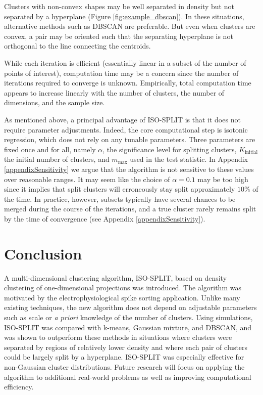 \documentclass[10pt]{article}
\begin{document}
Clusters with non-convex shapes may be well separated in density but not separated by a hyperplane (Figure \ref{fig:example_dbscan}). In these situations, alternative methods such as DBSCAN are preferable. But even when clusters are convex, a pair may be oriented such that the separating hyperplane is not orthogonal to the line connecting the centroids.

While each iteration is efficient (essentially linear in a subset of the number of points of interest), computation time may be a concern since the number of iterations required to converge is unknown. Empirically, total computation time appears to increase linearly with the number of clusters, the number of dimensions, and the sample size.

As mentioned above, a principal advantage of ISO-SPLIT is that it does not require parameter adjustments. Indeed, the core computational step is isotonic regression, which does not rely on any tunable parameters. Three parameters are fixed once and for all, namely $\alpha$, the significance level for splitting clusters, $K_\text{initial}$ the initial number of clusters, and $m_\text{max}$ used in the test statistic. In Appendix \ref{appendixSensitivity} we argue that the algorithm is not sensitive to these values over reasonable ranges. It may seem like the choice of $\alpha=0.1$ may be too high since it implies that split clusters will erroneously stay split approximately $10\%$ of the time. In practice, however, subsets typically have several chances to be merged during the course of the iterations, and a true cluster rarely remains split by the time of convergence (see Appendix \ref{appendixSensitivity}).


\section{Conclusion}
\label{s:conc}

A multi-dimensional clustering algorithm, ISO-SPLIT, based on density clustering of one-dimensional projections was introduced. The algorithm was motivated by the electrophysiological spike sorting application. Unlike many existing techniques, the new algorithm does not depend on adjustable parameters such as scale or \emph{a priori} knowledge of the number of clusters. Using simulations, ISO-SPLIT was compared with k-means, Gaussian mixture, and DBSCAN, and was shown to outperform these methods in situations where clusters were separated by regions of relatively lower density and where each pair of clusters could be largely split by a hyperplane. ISO-SPLIT was especially effective for non-Gaussian cluster distributions. Future research will focus on applying the algorithm to additional real-world problems as well as improving computational efficiency.
\end{document}
